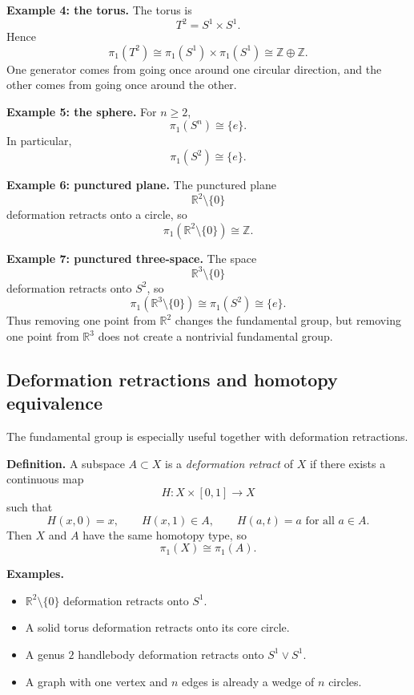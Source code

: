 \documentclass[12pt,a4paper]{article}
\theoremstyle{notespace}
\begin{document}
\textbf{Example 4: the torus.}
The torus is
\[
T^2=S^1\times S^1.
\]
Hence
\[
\pi_1(T^2)\cong \pi_1(S^1)\times \pi_1(S^1)\cong \mathbb Z\oplus \mathbb Z.
\]
One generator comes from going once around one circular direction, and the other comes from going once around the other.

\medskip

\textbf{Example 5: the sphere.}
For \(n\ge 2\),
\[
\pi_1(S^n)\cong \{e\}.
\]
In particular,
\[
\pi_1(S^2)\cong \{e\}.
\]

\medskip

\textbf{Example 6: punctured plane.}
The punctured plane
\[
\mathbb R^2\setminus \{0\}
\]
deformation retracts onto a circle, so
\[
\pi_1(\mathbb R^2\setminus \{0\})\cong \mathbb Z.
\]

\medskip

\textbf{Example 7: punctured three-space.}
The space
\[
\mathbb R^3\setminus \{0\}
\]
deformation retracts onto \(S^2\), so
\[
\pi_1(\mathbb R^3\setminus \{0\})\cong \pi_1(S^2)\cong \{e\}.
\]
Thus removing one point from \(\mathbb R^2\) changes the fundamental group, but removing one point from \(\mathbb R^3\) does not create a nontrivial fundamental group.

\subsection{Deformation retractions and homotopy equivalence}

The fundamental group is especially useful together with deformation retractions.

\textbf{Definition.}
A subspace \(A\subset X\) is a \emph{deformation retract} of \(X\) if there exists a continuous map
\[
H:X\times[0,1]\to X
\]
such that
\[
H(x,0)=x,\qquad H(x,1)\in A,
\qquad H(a,t)=a \text{ for all } a\in A.
\]
Then \(X\) and \(A\) have the same homotopy type, so
\[
\pi_1(X)\cong \pi_1(A).
\]

\medskip

\textbf{Examples.}
\begin{itemize}
	\item \(\mathbb R^2\setminus\{0\}\) deformation retracts onto \(S^1\).
	\item A solid torus deformation retracts onto its core circle.
	\item A genus \(2\) handlebody deformation retracts onto \(S^1\vee S^1\).
	\item A graph with one vertex and \(n\) edges is already a wedge of \(n\) circles.
\end{itemize}
\end{document}
